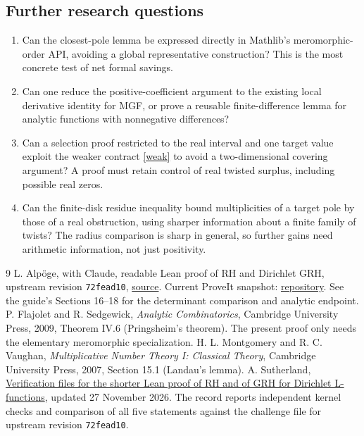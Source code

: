 \documentclass[11pt]{article}
\theoremstyle{remark}\newtheorem{remark}[theorem]{Remark}
\begin{document}
\subsection*{Further research questions}
\begin{enumerate}
\item Can the closest-pole lemma be expressed directly in Mathlib's meromorphic-order API, avoiding a global representative construction? This is the most concrete test of net formal savings.
\item Can one reduce the positive-coefficient argument to the existing local derivative identity for MGF, or prove a reusable finite-difference lemma for analytic functions with nonnegative differences?
\item Can a selection proof restricted to the real interval and one target value exploit the weaker contract \eqref{weak} to avoid a two-dimensional covering argument? A proof must retain control of real twisted surplus, including possible real zeros.
\item Can the finite-disk residue inequality bound multiplicities of a target pole by those of a real obstruction, using sharper information about a finite family of twists? The radius comparison is sharp in general, so further gains need arithmetic information, not just positivity.
\end{enumerate}
\begin{thebibliography}{9}
 L. Alp\"oge, with Claude, readable Lean proof of RH and Dirichlet GRH, upstream revision \texttt{72fead10}, \href{https://github.com/lsernau/grh-lean/tree/72fead102f663d5c7a407964a13dc0cf9d977207/grh}{source}. Current ProveIt snapshot: \href{https://github.com/VladimirReshetnikov/ProveIt/tree/ef7d441dcb37ea944b7ac15731bb766f2e1354ea/Analysis/GeneralizedRiemannHypothesis}{repository}. See the guide's Sections 16--18 for the determinant comparison and analytic endpoint.
 P. Flajolet and R. Sedgewick, \emph{Analytic Combinatorics}, Cambridge University Press, 2009, Theorem IV.6 (Pringsheim's theorem). The present proof only needs the elementary meromorphic specialization.
 H. L. Montgomery and R. C. Vaughan, \emph{Multiplicative Number Theory I: Classical Theory}, Cambridge University Press, 2007, Section 15.1 (Landau's lemma).
 A. Sutherland, \href{https://math.mit.edu/~drew/shortgrh/}{Verification files for the shorter Lean proof of RH and of GRH for Dirichlet L-functions}, updated 27 November 2026. The record reports independent kernel checks and comparison of all five statements against the challenge file for upstream revision \texttt{72fead10}.
\end{thebibliography}
\end{document}
